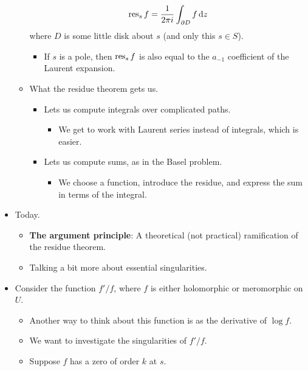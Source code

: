 \documentclass[../notes.tex]{subfiles}
\begin{document}
\begin{itemize}
\begin{itemize}
        \begin{equation*}
            \operatorname{res}_sf = \frac{1}{2\pi i}\int_{\partial D}f\dd{z}
        \end{equation*}
        where $D$ is some little disk about $s$ (and only this $s\in S$).
        \begin{itemize}
            \item If $s$ is a pole, then $\operatorname{res}_sf$ is also equal to the $a_{-1}$ coefficient of the Laurent expansion.
        \end{itemize}
        \item What the residue theorem gets us.
        \begin{itemize}
            \item Lets us compute integrals over complicated paths.
            \begin{itemize}
                \item We get to work with Laurent series instead of integrals, which is easier.
            \end{itemize}
            \item Lets us compute sums, as in the Basel problem.
            \begin{itemize}
                \item We choose a function, introduce the residue, and express the sum in terms of the integral.
            \end{itemize}
        \end{itemize}
    \end{itemize}
    \item Today.
    \begin{itemize}
        \item \textbf{The argument principle}: A theoretical (not practical) ramification of the residue theorem.
        \item Talking a bit more about essential singularities.
    \end{itemize}
    \item Consider the function $f'/f$, where $f$ is either holomorphic or meromorphic on $U$.
    \begin{itemize}
        \item Another way to think about this function is as the derivative of $\log f$.
        \item We want to investigate the singularities of $f'/f$.
        \item Suppose $f$ has a zero of order $k$ at $s$.
        \begin{itemize}

\end{itemize}
\end{itemize}
\end{itemize}
\end{document}
